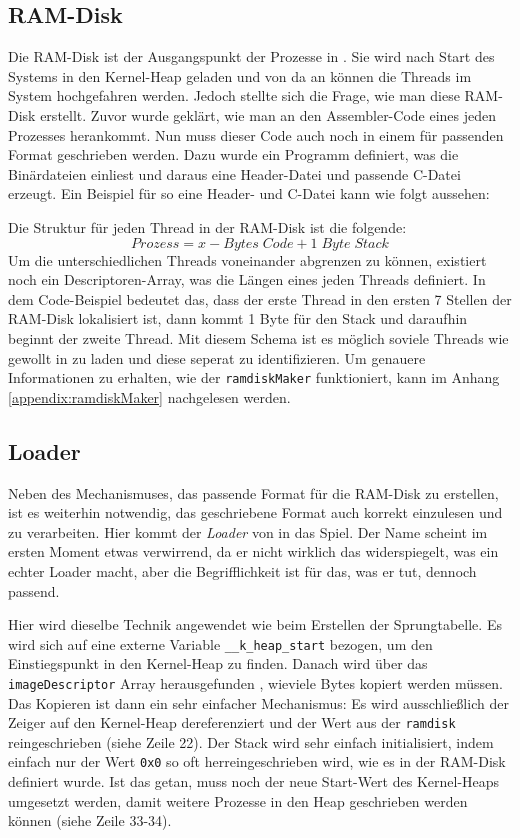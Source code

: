 \subsection{RAM-Disk}
Die RAM-Disk ist der Ausgangspunkt der Prozesse in \mops. Sie wird nach Start des Systems in den Kernel-Heap geladen und von da an k\"onnen die Threads im System hochgefahren werden. Jedoch stellte sich die Frage, wie man diese RAM-Disk erstellt. Zuvor wurde gekl\"art, wie man an den Assembler-Code eines jeden Prozesses herankommt. Nun muss dieser Code auch noch in einem f\"ur \mops passenden Format geschrieben werden. Dazu wurde ein Programm definiert, was die Bin\"ardateien einliest und daraus eine Header-Datei und passende C-Datei erzeugt. Ein Beispiel f\"ur so eine Header- und C-Datei kann wie folgt aussehen:


Die Struktur f\"ur jeden Thread in der RAM-Disk ist die folgende:
$$Prozess = x-Bytes\;Code + 1\;Byte\;Stack$$
Um die unterschiedlichen Threads voneinander abgrenzen zu k\"onnen, existiert noch ein Descriptoren-Array, was die L\"angen eines jeden Threads definiert. In dem Code-Beispiel bedeutet das, dass der erste Thread in den ersten 7 Stellen der RAM-Disk lokalisiert ist, dann kommt 1 Byte f\"ur den Stack und daraufhin beginnt der zweite Thread. Mit diesem Schema ist es m\"oglich soviele Threads wie gewollt in \mops zu laden und diese seperat zu identifizieren. Um genauere Informationen zu erhalten, wie der \texttt{ramdiskMaker} funktioniert, kann im Anhang \ref{appendix:ramdiskMaker} nachgelesen werden.
\subsection{\mops Loader}
Neben des Mechanismuses, das passende Format f\"ur die RAM-Disk zu erstellen, ist es weiterhin notwendig, das geschriebene Format auch korrekt einzulesen und zu verarbeiten. Hier kommt der \textit{Loader} von \mops in das Spiel. Der Name scheint im ersten Moment etwas verwirrend, da er nicht wirklich das widerspiegelt, was ein echter Loader macht, aber die Begrifflichkeit ist f\"ur das, was er tut, dennoch passend. 

Hier wird dieselbe Technik angewendet wie beim Erstellen der Sprungtabelle. Es wird sich auf eine externe Variable \texttt{\_\_k\_heap\_start} bezogen, um den Einstiegspunkt in den Kernel-Heap zu finden. Danach wird \"uber das \texttt{imageDescriptor} Array herausgefunden , wieviele Bytes kopiert werden m\"ussen. Das Kopieren ist dann ein sehr einfacher Mechanismus: Es wird ausschlie\ss lich der Zeiger auf den Kernel-Heap dereferenziert und der Wert aus der \texttt{ramdisk} reingeschrieben (siehe Zeile 22). Der Stack wird sehr einfach initialisiert, indem einfach nur der Wert \texttt{0x0} so oft herreingeschrieben wird, wie es in der RAM-Disk definiert wurde. Ist das getan, muss noch der neue Start-Wert des Kernel-Heaps umgesetzt werden, damit weitere Prozesse in den Heap geschrieben werden k\"onnen (siehe Zeile 33-34).
